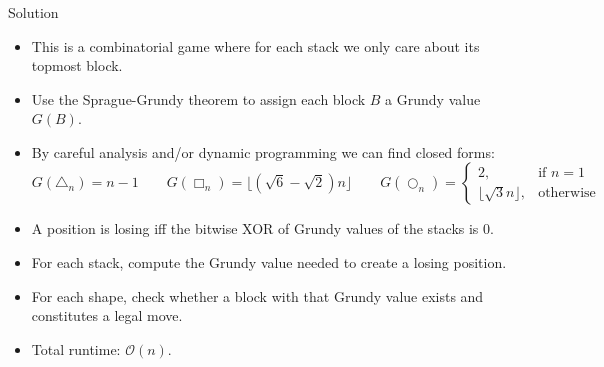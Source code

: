 \begin{frame}
  \frametitle{\problemtitle}
  \begin{block}{Solution}
    \begin{itemize}
      \item<+-> This is a combinatorial game where for each stack we only care about its topmost block.
      \item<+-> Use the Sprague-Grundy theorem to assign each block $B$ a Grundy value $G(B)$.
      \item<+-> By careful analysis and/or dynamic programming we can find closed forms:
        \[
          G(\triangle_n) = n-1 \qquad
          G(\Box_n) = \lfloor(\sqrt{6}-\sqrt{2})n\rfloor \qquad
          G(\bigcirc_n) = \begin{cases}
            2, & \text{if $n=1$} \\
            \lfloor\sqrt{3}n\rfloor, & \text{otherwise}
          \end{cases}
        \]
      \item<+-> A position is losing iff the bitwise XOR of Grundy values of the stacks is $0$.
      \item<+-> For each stack, compute the Grundy value needed to create a losing position.
      \item<+-> For each shape, check whether a block with that Grundy value exists and constitutes a legal move.
      \item<+-> Total runtime: $\mathcal{O}(n)$.
    \end{itemize}
  \end{block}
\end{frame}
